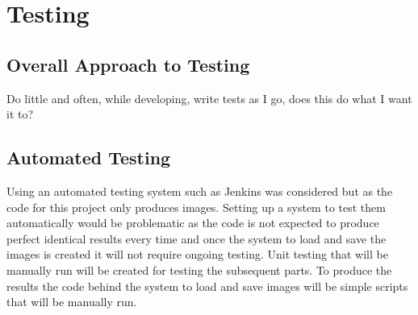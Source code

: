 \section{Testing}

\subsection{Overall Approach to Testing}

Do little and often, while developing, write tests as I go, does this do what I want it to?

\subsection{Automated Testing}
Using an automated testing system such as Jenkins was considered but as the code for this project only produces images.  Setting up a system to test them automatically would be problematic as the code is not expected to produce perfect identical results every time and once the system to load and save the images is created it will not require ongoing testing. Unit testing that will be manually run will be created for testing the subsequent parts. To produce the results the code behind the system to load and save images will be simple scripts that will be manually run.

